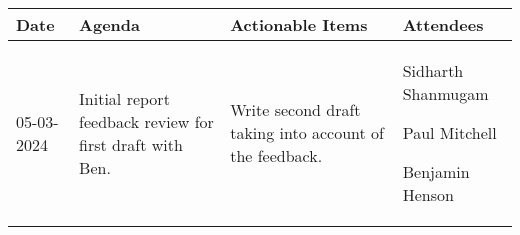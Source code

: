 \begin{table}[!h]
    \centering
    \begin{tabularx}{\textwidth}{|l|X|X|X|}
        \hline
        Date & Agenda & Actionable Items & Attendees \\
        \hline
        \hline
        05-03-2024 & 
        \begin{myitemize}
            \item Initial report feedback review for first draft with Ben.
        \end{myitemize} & 
        \begin{myitemize}
            \item Write second draft taking into account of the feedback.
        \end{myitemize} & 
        \begin{myitemize}
            \item Sidharth Shanmugam
            \item Paul Mitchell
            \item Benjamin Henson
        \end{myitemize} \\
        \hline
    \end{tabularx}
\end{table}

